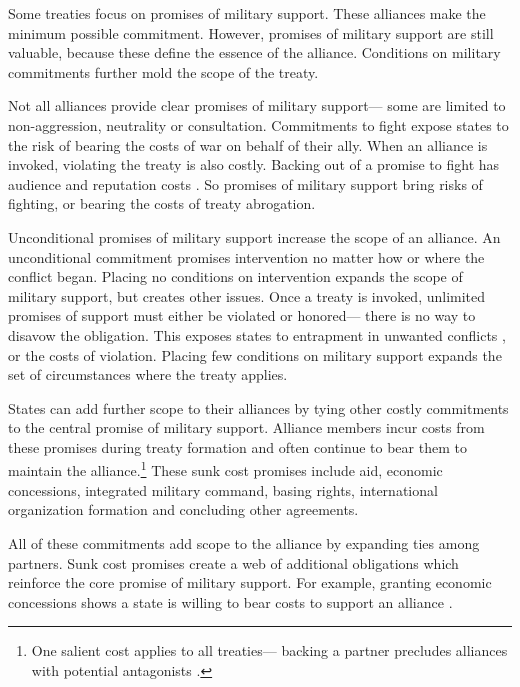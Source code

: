\documentclass[12pt]{article}
\begin{document}
Some treaties focus on promises of military support. 
These alliances make the minimum possible commitment. 
However, promises of military support are still valuable, because these define the essence of the alliance.  
Conditions on military commitments further mold the scope of the treaty. 


Not all alliances provide clear promises of military support--- some are limited to non-aggression, neutrality or consultation. 
Commitments to fight expose states to the risk of bearing the costs of war on behalf of their ally. 
When an alliance is invoked, violating the treaty is also costly. 
Backing out of a promise to fight has audience \citep{Levyetal2015} and reputation costs \citep{Gibler2008, Crescenzietal2012, Mattes2012}. 
So promises of military support bring risks of fighting, or bearing the costs of treaty abrogation. 


Unconditional promises of military support increase the scope of an alliance. 
An unconditional commitment promises intervention no matter how or where the conflict began. 
Placing no conditions on intervention expands the scope of military support, but creates other issues. 
Once a treaty is invoked, unlimited promises of support must either be violated or honored--- there is no way to disavow the obligation. 
This exposes states to entrapment in unwanted conflicts \citep{Snyder1990, Benson2012}, or the costs of violation. 
Placing few conditions on military support expands the set of circumstances where the treaty applies.  


States can add further scope to their alliances by tying other costly commitments to the central promise of military support. 
Alliance members incur costs from these promises during treaty formation and often continue to bear them to maintain the alliance.\footnote{
One salient cost applies to all treaties--- backing a partner precludes alliances with potential antagonists \citep{Snyder1997}.} 
These sunk cost promises include aid, economic concessions, integrated military command, basing rights, international organization formation and concluding other agreements. 


All of these commitments add scope to the alliance by expanding ties among partners. 
Sunk cost promises create a web of additional obligations which reinforce the core promise of military support.  
For example, granting economic concessions shows a state is willing to bear costs to support an alliance \citep{WolfordKim2017}. 
\end{document}
